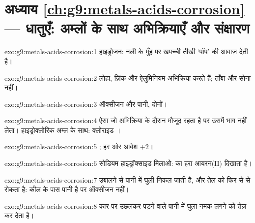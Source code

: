 \section*{अध्याय \ref{ch:g9:metals-acids-corrosion} --- धातुएँ: अम्लों के साथ अभिक्रियाएँ और संक्षारण}

\begin{solution}{exo:g9:metals-acids-corrosion:1}
हाइड्रोजन: नली के मुँह पर  खपच्ची तीखी `पॉप' की आवाज़ देती है।
\end{solution}

\begin{solution}{exo:g9:metals-acids-corrosion:2}
लोहा, ज़िंक और ऐलुमिनियम अभिक्रिया करते हैं; ताँबा और सोना नहीं।
\end{solution}

\begin{solution}{exo:g9:metals-acids-corrosion:3}
ऑक्सीजन और पानी, दोनों।
\end{solution}

\begin{solution}{exo:g9:metals-acids-corrosion:4}
ऐसा  जो अभिक्रिया के दौरान मौजूद रहता है पर उसमें भाग नहीं लेता।
हाइड्रोक्लोरिक अम्ल के साथ: क्लोराइड  ।
\end{solution}

\begin{solution}{exo:g9:metals-acids-corrosion:5}
; हर ओर आवेश $+2$।
\end{solution}

\begin{solution}{exo:g9:metals-acids-corrosion:6}
सोडियम हाइड्रॉक्साइड मिलाओ:  का हरा 
आयरन(II)  दिखाता है।
\end{solution}

\begin{solution}{exo:g9:metals-acids-corrosion:7}
उबालने से पानी में घुली  निकल जाती है, और तेल  को फिर से  से रोकता
है: कील के पास पानी है पर ऑक्सीजन नहीं।
\end{solution}

\begin{solution}{exo:g9:metals-acids-corrosion:8}
कार पर उछलकर पड़ने वाले पानी में घुला नमक  लगने को तेज़ कर देता है।
\end{solution}

